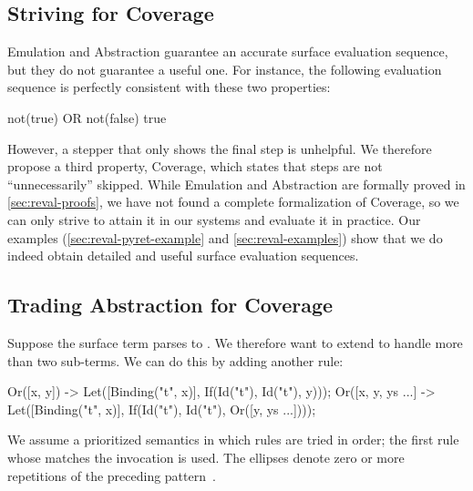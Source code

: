 \subsection{Striving for Coverage}

Emulation and Abstraction guarantee an accurate
surface evaluation sequence, but they do not guarantee a useful one. For
instance, the following evaluation sequence is perfectly consistent with
these two properties:
\begin{Codes}
    not(true) OR not(false)
\SurfStep true
\end{Codes}
However, a stepper that only shows the final step is unhelpful. We therefore
propose a third property, Coverage, which states that steps
are not ``unnecessarily'' skipped. While Emulation and
Abstraction are formally proved in \cref{sec:reval-proofs}, we have not found a
complete formalization of Coverage, so we can only strive to attain it in
our systems and evaluate it in practice.
Our examples
(\cref{sec:reval-pyret-example} and \cref{sec:reval-examples}) show
that we do indeed obtain detailed and useful surface evaluation sequences.

\subsection{Trading Abstraction for Coverage}
\label{sec:reval-trading}

Suppose the surface term  parses to
. We therefore want to extend 
to handle more than two sub-terms.  We can do this by adding another
rule:
\begin{Codes}
Or([x, y]) ->
  Let([Binding("t", x)],
      If(Id("t"), Id("t"), y)));
Or([x, y, ys ...] ->
  Let([Binding("t", x)],
      If(Id("t"), Id("t"), Or([y, ys ...])));
\end{Codes}
We assume a prioritized semantics in which rules are tried in
order; the first rule whose  matches the invocation is
used. The ellipses denote zero or more repetitions
of the preceding pattern~\cite{macro-by-example}.

